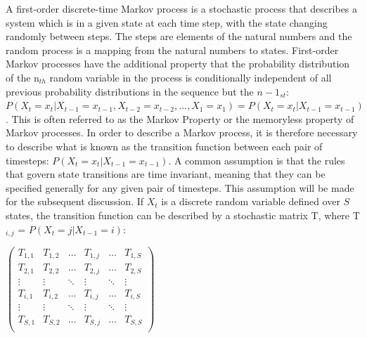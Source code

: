 A first-order discrete-time Markov process is a stochastic process that describes a system which is in a given state at each time step, with the state changing randomly between steps. The steps are elements of the natural numbers and the random process is a mapping from the natural numbers to states. First-order Markov processes have the additional property that the probability distribution of the n$_{th}$ random variable in the process is conditionally independent of all previous probability distributions in the sequence but the $n-1_{st}$: $P(X_t = x_t | X_{t-1} = x_{t-1}, X_{t-2} = x_{t-2}, ... , X_{1} = x_{1}) = P(X_t = x_t | X_{t-1} = x_{t-1})$. This is often referred to as the Markov Property or the memoryless property of Markov processes. In order to describe a Markov process, it is therefore necessary to describe what is known as the transition function between each pair of timesteps: $P(X_t = x_t | X_{t-1} = x_{t-1})$. A common assumption is that the rules that govern state transitions are time invariant, meaning that they can be specified generally for any given pair of timesteps. This assumption will be made for the subsequent discussion. If $X_t$ is a discrete random variable defined over $S$ states, the transition function can be described by a stochastic matrix T, where T$_{i,j}$ = $P(X_t = j | X_{t-1} = i)$: 

\begin{center}
{$\displaystyle \left({\begin{matrix}T_{1,1}&T_{1,2}&\dots &T_{1,j}&\dots &T_{1,S}\\T_{2,1}&T_{2,2}&\dots &T_{2,j}&\dots &T_{2,S}\\\vdots &\vdots &\ddots &\vdots &\ddots &\vdots \\T_{i,1}&T_{i,2}&\dots &T_{i,j}&\dots &T_{i,S}\\\vdots &\vdots &\ddots &\vdots &\ddots &\vdots \\T_{S,1}&T_{S,2}&\dots &T_{S,j}&\dots &T_{S,S}\\\end{matrix}}\right)$}
\end{center}
\par

